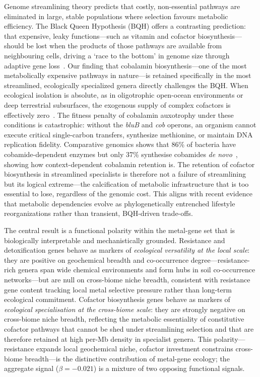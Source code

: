 \documentclass[times]{zHenriquesLab-StyleBioRxiv}
\begin{document}
Genome streamlining theory predicts that costly, non-essential pathways are
eliminated in large, stable populations where selection favours metabolic
efficiency. The Black Queen Hypothesis (BQH) offers a contrasting prediction:
that expensive, leaky functions---such as vitamin and cofactor
biosynthesis---should be lost when the products of those pathways are available
from neighbouring cells, driving a `race to the bottom' in genome size through
adaptive gene loss~\cite{fullmer2015}. Our finding that cobalamin biosynthesis---one of the most
metabolically expensive pathways in nature---is retained specifically in the
most streamlined, ecologically specialized genera directly challenges the BQH.
When ecological isolation is absolute, as in oligotrophic open-ocean
environments or deep terrestrial subsurfaces, the exogenous supply of complex
cofactors is effectively zero~\cite{sanudo2014}. The fitness penalty of cobalamin auxotrophy
under these conditions is catastrophic: without the \textit{bluB} and
\textit{cob} operons, an organism cannot execute critical single-carbon
transfers, synthesize methionine, or maintain DNA replication fidelity.
Comparative genomics shows that 86\% of bacteria have cobamide-dependent
enzymes but only 37\% synthesise cobamides \textit{de novo}~\cite{shelton2019},
showing how context-dependent cobalamin retention is. The
retention of cofactor biosynthesis in streamlined specialists is therefore not
a failure of streamlining but its logical extreme---the calcification of
metabolic infrastructure that is too essential to lose, regardless of the
genomic cost. This aligns with recent evidence that metabolic dependencies
evolve as phylogenetically entrenched lifestyle reorganizations rather than
transient, BQH-driven trade-offs.

The central result is a functional polarity within the metal-gene
set that is biologically interpretable and mechanistically grounded. Resistance
and detoxification genes behave as markers of \emph{ecological versatility at
the local scale}: they are positive on geochemical breadth and co-occurrence
degree---resistance-rich genera span wide chemical environments and form hubs in
soil co-occurrence networks---but are null on cross-biome niche breadth,
consistent with resistance gene content tracking local metal selective pressure
rather than long-term ecological commitment. Cofactor biosynthesis genes behave
as markers of \emph{ecological specialisation at the cross-biome scale}: they
are strongly negative on cross-biome niche breadth, reflecting the metabolic
essentiality of constitutive cofactor pathways that cannot be shed under
streamlining selection and that are therefore retained at high per-Mb density
in specialist genera. This polarity---resistance expands local geochemical
niche, cofactor investment constrains cross-biome breadth---is the distinctive
contribution of metal-gene ecology; the aggregate signal ($\beta = -0.021$)
is a mixture of two opposing functional signals.
\end{document}
